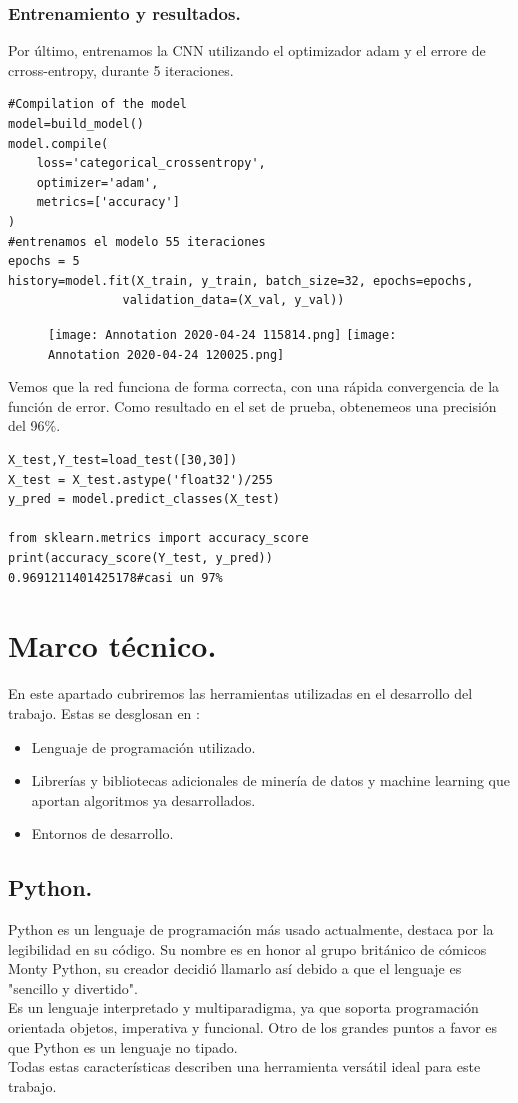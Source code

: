 \documentclass[a4paper,10pt]{article}
\begin{document}
\subsubsection{Entrenamiento y resultados.}
Por último, entrenamos la CNN utilizando el optimizador adam y el errore de crross-entropy, durante 5 iteraciones.
\begin{lstlisting}
#Compilation of the model
model=build_model()
model.compile(
    loss='categorical_crossentropy', 
    optimizer='adam', 
    metrics=['accuracy']
)
#entrenamos el modelo 55 iteraciones
epochs = 5
history=model.fit(X_train, y_train, batch_size=32, epochs=epochs,
				validation_data=(X_val, y_val))
\end{lstlisting}
\begin{figure}[H]
\centering
\texttt{[image: Annotation 2020-04-24 115814.png]}\hfill
\texttt{[image: Annotation 2020-04-24 120025.png]}
\end{figure}

\noindent
Vemos que la red funciona de forma correcta, con una rápida convergencia de la función de error. Como resultado en el set de prueba, obtenemeos una precisión del 96\%.

\begin{lstlisting}
X_test,Y_test=load_test([30,30])
X_test = X_test.astype('float32')/255 
y_pred = model.predict_classes(X_test)

from sklearn.metrics import accuracy_score
print(accuracy_score(Y_test, y_pred))
0.9691211401425178#casi un 97%
\end{lstlisting}


\section{Marco técnico.}
En este apartado cubriremos las herramientas utilizadas en el desarrollo del trabajo. Estas se desglosan en :
\begin{itemize}
\item Lenguaje de programación utilizado.
\item Librerías y bibliotecas adicionales de minería de datos y machine learning que aportan algoritmos ya desarrollados.
\item Entornos  de desarrollo.
\end{itemize}
\subsection{Python.}
Python es un lenguaje de programación	más usado actualmente, destaca por la legibilidad en su código. Su nombre es en honor al grupo británico de cómicos Monty Python, su creador decidió llamarlo así debido a que el lenguaje es "sencillo y divertido".\\
Es un lenguaje interpretado y  multiparadigma, ya que soporta programación orientada objetos, imperativa y funcional. Otro de los grandes puntos a favor es que Python es un lenguaje no tipado.\\
Todas estas características describen una herramienta versátil ideal para este trabajo. 
\end{document}
